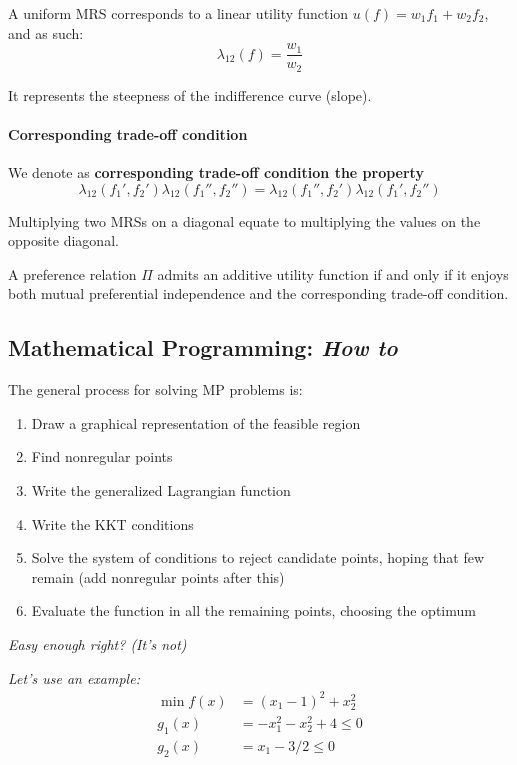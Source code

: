 A uniform MRS corresponds to a linear utility function $u(f) = w_1 f_1 + w_2 f_2$, and as such:
$$ \lambda_{12} (f) = \frac{w_1}{w_2} $$

It represents the steepness of the indifference curve (slope).

\paragraph{Corresponding trade-off condition} We denote as \textbf{corresponding trade-off condition the property}
$$ \lambda_{12} (f_1', f_2') \lambda_{12} (f_1'', f_2'') = \lambda_{12} (f_1'', f_2') \lambda_{12} (f_1', f_2'')$$

Multiplying two MRSs on a diagonal equate to multiplying the values on the opposite diagonal.

A preference relation $\Pi$ admits an additive utility function if and only if it enjoys both mutual preferential independence and the corresponding trade-off condition.


\subsection{Mathematical Programming: \textit{How to}}

The general process for solving MP problems is: 
\begin{enumerate}
	\item Draw a graphical representation of the feasible region
	
	\item Find nonregular points
	
	\item Write the generalized Lagrangian function
	
	\item Write the KKT conditions
	
	\item Solve the system of conditions to reject candidate points, hoping that few remain (add nonregular points after this)
	
	\item Evaluate the function in all the remaining points, choosing the optimum
\end{enumerate}

\textit{Easy enough right? (It's not)}

\textit{Let's use an example:
\begin{align*}
	\min f(x) & = (x_1 - 1)^2 + x_2^2 \\
	g_1 (x) & = -x_1^2 -x_2^2 + 4 \leq 0 \\
	g_2 (x) & = x_1 - 3/2 \leq 0
\end{align*}}

